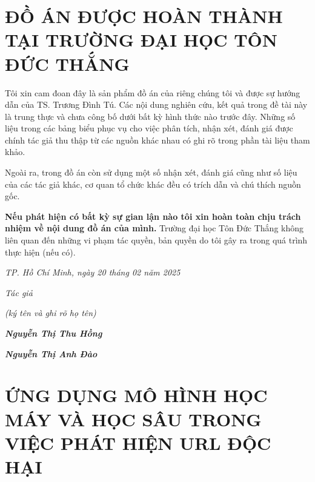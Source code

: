 \documentclass[13pt]{article}
\begin{document}
\newpage

\section*{ĐỒ ÁN ĐƯỢC HOÀN THÀNH TẠI TRƯỜNG ĐẠI HỌC TÔN ĐỨC THẮNG}
    Tôi xin cam đoan đây là sản phẩm đồ án của riêng chúng tôi và được sự hướng dẫn của TS. Trương Đình Tú. Các nội dung nghiên cứu, kết quả trong đề tài này là trung thực và chưa công bố dưới bất kỳ hình thức nào trước đây. Những số liệu trong các bảng biểu phục vụ cho việc phân tích, nhận xét, đánh giá được chính tác giả thu thập từ các nguồn khác nhau có ghi rõ trong phần tài liệu tham khảo.
    
    Ngoài ra, trong đồ án còn sử dụng một số nhận xét, đánh giá cũng như số liệu của các tác giả khác, cơ quan tổ chức khác đều có trích dẫn và chú thích nguồn gốc.
    
    \textbf{Nếu phát hiện có bất kỳ sự gian lận nào tôi xin hoàn toàn chịu trách nhiệm về nội dung đồ án của mình.} Trường đại học Tôn Đức Thắng không liên quan đến những vi phạm tác quyền, bản quyền do tôi gây ra trong quá trình thực hiện (nếu có).

\begin{flushright}
    \textit{TP. Hồ Chí Minh, ngày 20 tháng 02 năm 2025}\\      
    \begin{adjustwidth}{10cm}{}
    \textit{Tác giả}\\
    \end{adjustwidth} 
    
    \begin{adjustwidth}{8cm}{}
	\textit{(ký tên và ghi rõ họ tên)}\\
    \end{adjustwidth} 
    
    \begin{adjustwidth}{8.5cm}{}
    \textbf{\textit{Nguyễn Thị Thu Hồng}}\\
    \end{adjustwidth} 
    
    \begin{adjustwidth}{8.5cm}{}
    \textbf{\textit{Nguyễn Thị Anh Đào}}
    \end{adjustwidth} 
\end{flushright}

\newpage
\section*{ỨNG DỤNG MÔ HÌNH HỌC MÁY VÀ HỌC SÂU TRONG VIỆC PHÁT HIỆN URL ĐỘC HẠI}
\end{document}
